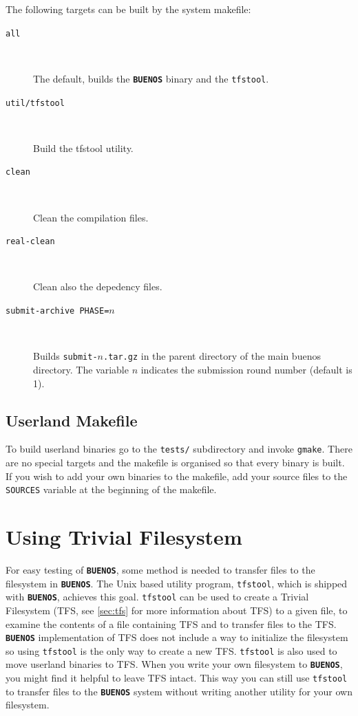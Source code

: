 \documentclass[twoside,a4paper]{report}
\newcommand{\buenos}{\texttt{\textbf{BUENOS}}}
\begin{document}
The following targets can be built by the system makefile:

\nopagebreak
\begin{description}
\item[\texttt{all}]~

The default, builds the \buenos{} binary and the \texttt{tfstool}.

\item[\texttt{util/tfstool}]~

Build the tfstool utility.

\item[\texttt{clean}]~

Clean the compilation files.

\item[\texttt{real-clean}]~

Clean also the depedency files.

\item[\texttt{submit-archive PHASE=$n$}]~

Builds \texttt{submit-$n$.tar.gz} in the parent directory of the main
buenos directory.  The variable $n$ indicates the submission round
number (default is 1).

\end{description}

\subsection{Userland Makefile}


To build userland binaries go to the \texttt{tests/} subdirectory and
invoke \texttt{gmake}. There are no special targets and the makefile is
organised so that every binary is built. If you wish to add your own
binaries to the makefile, add your source files to the
\texttt{SOURCES} variable at the beginning of the makefile.


\section{Using Trivial Filesystem}
\label{sec:tfstool}


For easy testing of \buenos{}, some method is needed to transfer files
to the filesystem in \buenos{}. The Unix based utility program,
\texttt{tfstool}, which is shipped with \buenos{}, achieves this goal.
\texttt{tfstool} can be used to create a Trivial Filesystem (TFS, see
\autoref{sec:tfs} for more information about TFS) to a given file, to
examine the contents of a file containing TFS and to transfer files to
the TFS. \buenos{} implementation of TFS does not include a way to
initialize the filesystem so using \texttt{tfstool} is the only way to
create a new TFS. \texttt{tfstool} is also used to move userland
binaries to TFS. When you write your own filesystem to \buenos{}, you
might find it helpful to leave TFS intact. This way you can still use
\texttt{tfstool} to transfer files to the \buenos{} system without
writing another utility for your own filesystem.
\end{document}

